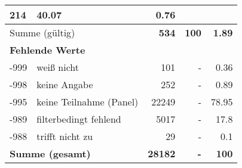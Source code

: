 \begin{longtable}{lXrrr}
       \num{214} &
       \num[round-mode=places,round-precision=2]{40,07} &
         \num[round-mode=places,round-precision=2]{0,76} \\
     \midrule
     \multicolumn{2}{l}{Summe (gültig)} &
       \textbf{\num{534}} &
     \textbf{100} &
       \textbf{\num[round-mode=places,round-precision=2]{1,89}} \\
     \multicolumn{5}{l}{\textbf{Fehlende Werte}}\\
       -999 &
       weiß nicht &
         \num{101} &
        - &
         \num[round-mode=places,round-precision=2]{0,36} \\
       -998 &
       keine Angabe &
         \num{252} &
        - &
         \num[round-mode=places,round-precision=2]{0,89} \\
       -995 &
       keine Teilnahme (Panel) &
         \num{22249} &
        - &
         \num[round-mode=places,round-precision=2]{78,95} \\
       -989 &
       filterbedingt fehlend &
         \num{5017} &
        - &
         \num[round-mode=places,round-precision=2]{17,8} \\
       -988 &
       trifft nicht zu &
         \num{29} &
        - &
         \num[round-mode=places,round-precision=2]{0,1} \\
     \midrule
     \multicolumn{2}{l}{\textbf{Summe (gesamt)}} &
          \textbf{\num{28182}} &
        \textbf{-} &
        \textbf{100} \\
     \bottomrule
     \end{longtable}
     
